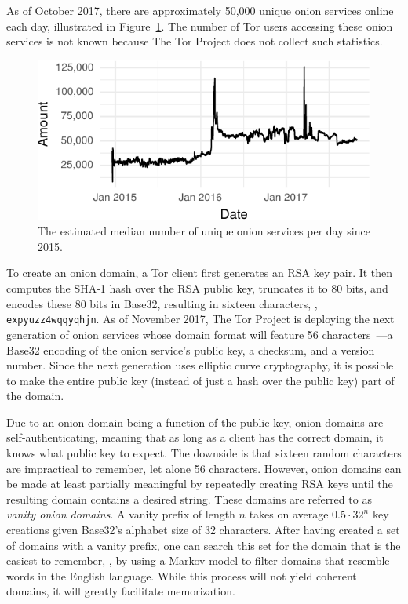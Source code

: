 As of October 2017, there are approximately 50,000 unique onion services online
each day, illustrated in Figure~\ref{fig:os-growth}.  The number of Tor users
accessing these onion services is not known because The Tor Project does not
collect such statistics.

\begin{figure}[t]
\includegraphics[width=\linewidth]{figures/os-growth.pdf}
\caption{The estimated median number of unique onion services per day since
2015.}
\label{fig:os-growth}
\end{figure}

To create an onion domain, a Tor client first generates an RSA key pair.  It
then computes the SHA-1 hash over the RSA public key, truncates it to 80 bits,
and encodes these 80 bits in Base32, resulting in sixteen characters, \eg,
\texttt{expyuzz4wqqyqhjn}.  As of November 2017, The Tor Project is deploying
the next generation of onion services whose domain format will feature 56
characters~\cite[\S~6]{Mathewson2013a}---a Base32 encoding of the onion
service's public key, a checksum, and a version number.  Since the next
generation uses elliptic curve cryptography, it is possible to make the entire
public key (instead of just a hash over the public key) part of the domain.

Due to an onion domain being a function of the public key, onion domains are
self-authenticating, meaning that as long as a client has the correct domain, it
knows what public key to expect.  The downside is that sixteen random characters
are impractical to remember, let alone 56 characters.  However, onion domains
can be made at least partially meaningful by repeatedly creating RSA keys until
the resulting domain contains a desired string.  These domains are referred to
as \emph{vanity onion domains}.  A vanity prefix of length $n$ takes on average
$0.5 \cdot 32^n$ key creations given Base32's alphabet size of 32 characters.
After having created a set of domains with a vanity prefix, one can search this
set for the domain that is the easiest to remember, \eg, by using a Markov model
to filter domains that resemble words in the English language.  While this
process will not yield coherent domains, it will greatly facilitate
memorization.

